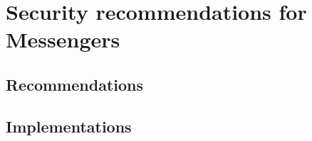 
\chapter{Security recommendations for Messengers}\label{ch:security-recommendations-for-messengers}

\section{Recommendations}\label{sec:recommendations}

\section{Implementations}\label{sec:implementations}